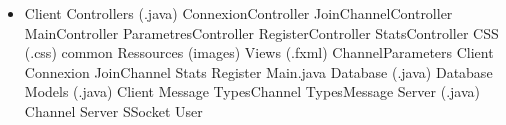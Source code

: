 \documentclass[11pt]{article}
\begin{document}
\begin{itemize}
    \item Client
        \subitem Controllers (.java)
            \subsubitem ConnexionController
            \subsubitem JoinChannelController
            \subsubitem MainController
            \subsubitem ParametresController
            \subsubitem RegisterController
            \subsubitem StatsController
        \subitem CSS (.css)
            \subsubitem common
        \subitem Ressources
            \subsubitem (images)
        \subitem Views (.fxml)
            \subsubitem ChannelParameters
            \subsubitem Client
            \subsubitem Connexion
            \subsubitem JoinChannel
            \subsubitem Stats
            \subsubitem Register
        Main.java
        \subitem Database (.java)
            \subsubitem Database
        \subitem Models (.java)
            \subsubitem Client
            \subsubitem Message
            \subsubitem TypesChannel
            \subsubitem TypesMessage
        \subitem Server (.java)
            \subsubitem Channel
            \subsubitem Server
            \subsubitem SSocket
            \subsubitem User
\end{itemize}
\end{document}
